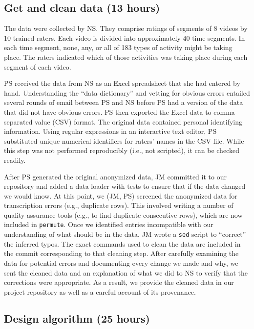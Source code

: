 \documentclass[]{article}
\begin{document}
\subsection{Get and clean data (13 hours)}

The data were collected by NS.
They comprise ratings of segments of 8 videos by 10 trained raters.
Each video is divided into approximately 40 time segments.
In each time segment, none, any, or all of 183 types of activity might be
taking place.
The raters indicated which of those activities was taking place during each
segment of each video.

PS received the data from NS as an Excel spreadsheet that she had entered
by hand.
Understanding the ``data dictionary'' and vetting for obvious errors entailed
several rounds of email between PS and NS before PS had a version of the data
that did not have obvious errors.
PS then exported the Excel data to comma-separated value (CSV) format.
The original data contained personal identifying information.
Using regular expressions in an interactive text editor, PS substituted
unique numerical identifiers for raters' names in the CSV file.
While this step was not performed reproducibly (i.e., not scripted), it can be
checked readily.

After PS generated the original anonymized data, JM committed it to our
repository and added a data loader with tests to ensure that if the data
changed we would know.
At this point, we (JM, PS) screened the anonymized data for transcription
errors (e.g., duplicate rows).
This involved writing a number of quality assurance tools (e.g., to find
duplicate consecutive rows), which are now included in \texttt{permute}.
Once we identified entries incompatible with our understanding of what should
be in the data, JM wrote a \texttt{sed} script to ``correct'' the inferred
typos.
The exact commands used to clean the data are included in the commit
corresponding to that cleaning step.
After carefully examining the data for potential errors and documenting
every change we made and why, we sent the cleaned data and an explanation
of what we did to NS to verify that the corrections were appropriate.
As a result, we provide the cleaned data in our project repository as well
as a careful account of its provenance.

\subsection{Design algorithm (25 hours)}
\end{document}

